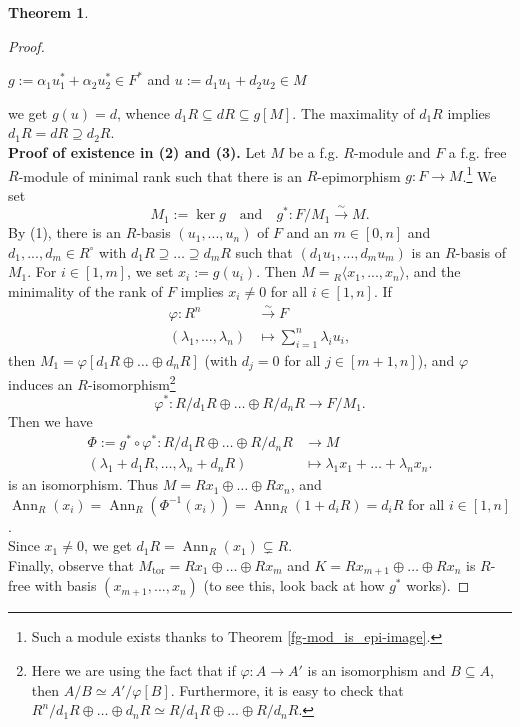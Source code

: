\documentclass[12pt,a4paper]{report}
\theoremstyle{definition}
\newtheorem{theorem}{Theorem}[chapter] %
\theoremstyle{num.custom-title}
\DeclareMathOperator{\tor}{tor}
\DeclareMathOperator{\Ann}{Ann}
\DeclareMathOperator{\sse}{\subseteq}
\renewcommand{\phi}{\varphi}
\begin{document}
\begin{theorem}
\begin{proof}
\begin{center}
$g:= \alpha_1 u_1^* + \alpha_2 u_2^* \in F^*$ and $u := d_1 u_1 + d_2 u_2 \in M$
\end{center}
we get $g(u)=d$, whence $d_1 R \sse dR \sse g[M]$. The maximality of $d_1 R$ implies $d_1 R = dR \supseteq d_2 R$.
\\[6pt]
\textbf{Proof of existence in (2) and (3).} Let $M$ be a f.g. $R$-module and $F$ a f.g. free $R$-module of minimal rank such that there is an $R$-epimorphism $g: F \to M$.\footnote{Such a module exists thanks to Theorem \ref{fg-mod_is_epi-image}.} We set
\[
M_1 := \ker g \quad \text{and} \quad g^* \colon F/M_1 \stackrel{\sim}{\to} M.
\]
By (1), there is an $R$-basis $(u_1,...,u_n)$ of $F$ and an $m \in [0,n]$ and $d_1,...,d_m \in R^\circ$ with $d_1 R \supseteq \ldots \supseteq d_m R$ such that $(d_1 u_1, ..., d_m u_m)$ is an $R$-basis of $M_1$. For $i \in [1,m]$, we set $x_i := g(u_i)$. Then $M = {}_R \langle x_1,...,x_n \rangle$, and the minimality of the rank of $F$ implies $x_i \neq 0$ for all $i \in [1,n]$. If
\begin{align*}
\phi \colon R^n &\stackrel{\sim}{\to} F \\
(\lambda_1, \ldots, \lambda_n) &\mapsto \sum_{i=1}^n \lambda_i u_i,
\end{align*}
then $M_1 = \phi[d_1 R \oplus \ldots \oplus d_n R]$ (with $d_j = 0$ for all $j \in [m+1,n]$), and $\phi$ induces an $R$-isomorphism\footnote{Here we are using the fact that if $\phi : A \to A'$ is an isomorphism and $B \sse A$, then $A/B \simeq A'/\phi[B]$. Furthermore, it is easy to check that $R^n/d_1R \oplus \ldots \oplus d_nR \simeq R/d_1 R \oplus \ldots \oplus R/d_n R$.}
\[
\phi^* \colon R/d_1 R \oplus \ldots \oplus R/d_n R \to F/M_1.
\]
Then we have
\begin{align*}
\Phi := g^* \circ \phi^* \colon R/d_1 R \oplus \ldots \oplus R/d_n R &\to M \\
(\lambda_1+d_1 R, \ldots, \lambda_n + d_n R) & \mapsto \lambda_1 x_1 + \ldots + \lambda_n x_n.
\end{align*}
is an isomorphism. Thus $M = R x_1 \oplus \ldots \oplus R x_n$, and $\Ann_R(x_i) = \Ann_R(\Phi^{-1}(x_i)) = \Ann_R(1+d_i R) = d_i R$ for all $i \in [1,n]$.\\
Since $x_1 \neq 0$, we get $d_1 R = \Ann_R(x_1) \subsetneq R$.\\
Finally, observe that $M_{\tor} = R x_1 \oplus \ldots \oplus R x_m$ and $K = R x_{m+1} \oplus \ldots \oplus R x_n$ is $R$-free with basis $(x_{m+1},...,x_n)$ (to see this, look back at how $g^*$ works).

\end{proof}
\end{theorem}
\end{document}
